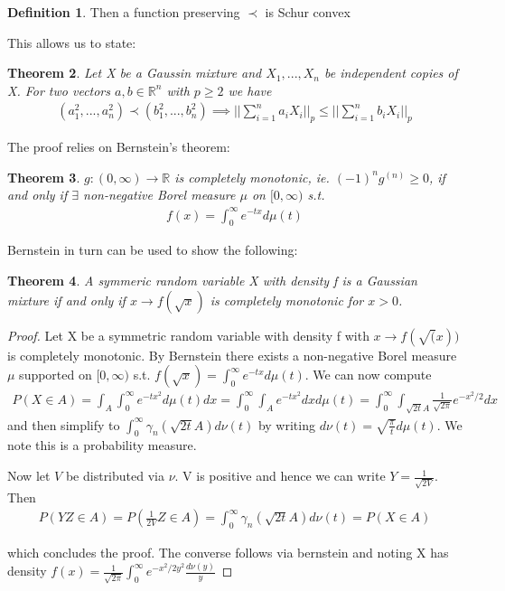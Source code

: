 \documentclass[10pt]{article}
\newcommand{\1}{\textbf{1}}
\newcommand{\R}{\mathbb{R}}
\newtheorem{theorem}{Theorem}
\theoremstyle{remark}
\theoremstyle{definition}
\newtheorem{defn}[theorem]{Definition}
\begin{document}
\begin{defn}
	Then a function preserving $\prec$ is Schur convex
\end{defn}

This allows us to state:

\begin{theorem}
	Let X be a Gaussin mixture and $X_1,...,X_n$ be independent copies of X. For two vectors $a,b \in \R^n$ with $p \geq 2$ we have
	\begin{align*}
		(a_1^2,...,a_n^2) \prec (b_1^2,...,b_n^2) \implies ||\sum_{i=1}^n a_iX_i||_p \leq ||\sum_{i=1}^n b_iX_i||_p
	\end{align*}
\end{theorem}


The proof relies on Bernstein's theorem:

\begin{theorem}
	$g : (0,\infty) \to \R$ is completely monotonic, ie. $(-1)^ng^{(n)} \geq 0$, if and only if $\exists$ non-negative Borel measure $\mu$ on $[0,\infty)$ s.t.
	\begin{align*}
		f(x) = \int_0^{\infty} e^{-tx}d\mu(t)
	\end{align*}
\end{theorem}

Bernstein in turn can be used to show the following:

\begin{theorem}
	A symmeric random variable X with density f is a Gaussian mixture if and only if $x \to f(\sqrt{x})$ is completely monotonic for $x > 0$. 
\end{theorem}


\begin{proof}
	Let X be a symmetric random variable with density f with $x \to f(\sqrt(x))$ is completely monotonic. By Bernstein there exists a non-negative Borel measure $\mu$ supported on $[0,\infty)$ s.t. $f(\sqrt{x}) = \int_0^{\infty}e^{-tx}d\mu(t)$. We can now compute
	\begin{align*}
		P(X \in A) = \int_A \int_0^{\infty} e^{-tx^2}d\mu(t)dx = \int_0^{\infty}\int_A e^{-tx^2}dxd\mu(t) = \int_0^{\infty} \int_{\sqrt{2t}A} \frac{1}{\sqrt{2\pi}}e^{-x^2/2}dx
	\end{align*}
	and then simplify to $\int_0^{\infty}\gamma_n(\sqrt{2t}A)d\nu(t)$ by writing $d\nu(t) = \sqrt{\frac{\pi}{t}}d\mu(t)$. We note this is a probability measure.

	Now let $V$ be distributed via $\nu$. V is positive and hence we can write $Y = \frac{1}{\sqrt{2V}}$. Then
	\begin{align*}
		P(YZ \in A) = P(\frac{1}{2V} Z \in A) = \int_0^{\infty}\gamma_n(\sqrt{2t}A)d\nu(t) = P(X \in A)
	\end{align*}

	which concludes the proof. The converse follows via bernstein and noting X has density $f(x) = \frac{1}{\sqrt{2 \pi}} \int_0^{\infty} e^{-x^2/2y^2}\frac{d\nu(y)}{y}$
\end{proof}
\end{document}
